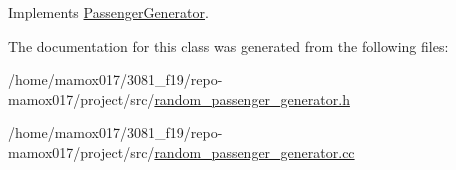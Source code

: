 Implements \hyperlink{classPassengerGenerator_ad2db96a13b34fcf35977287c06b31d47}{Passenger\+Generator}.



The documentation for this class was generated from the following files\+:\begin{DoxyCompactItemize}
\item 
/home/mamox017/3081\+\_\+f19/repo-\/mamox017/project/src/\hyperlink{random__passenger__generator_8h}{random\+\_\+passenger\+\_\+generator.\+h}\item 
/home/mamox017/3081\+\_\+f19/repo-\/mamox017/project/src/\hyperlink{random__passenger__generator_8cc}{random\+\_\+passenger\+\_\+generator.\+cc}\end{DoxyCompactItemize}
